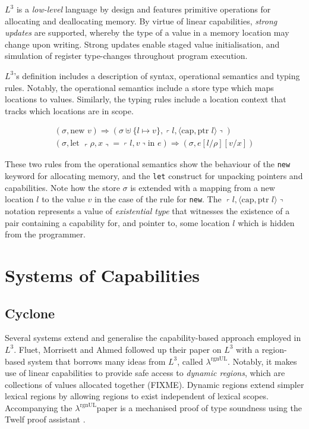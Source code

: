 \documentclass[]{unswthesis}
\newcommand{\lquine}{\left\ulcorner}
\newcommand{\rquine}{\right\urcorner}
\newcommand{\capa}{\text{cap}}
\newcommand{\ptr}{\text{ptr }}
\newcommand{\rgnUL}{$\lambda^\text{rgnUL}$\text{ }}
\begin{document}
$L^3$ is a \textit{low-level} language by design and features primitive operations for allocating and deallocating memory. By virtue of linear capabilities, \textit{strong updates} are supported, whereby the type of a value in a memory location may change upon writing. Strong updates enable staged value initialisation, and simulation of register type-changes throughout program execution.

$L^3$'s definition includes a description of syntax, operational semantics and typing rules. Notably, the operational semantics include a store type which maps locations to values. Similarly, the typing rules include a location context that tracks which locations are in scope.

\begin{eqnarray*}
(\sigma, \text{new } v) \Rightarrow (\sigma \uplus \{l \mapsto v\},
	\lquine l, \langle \capa, \ptr l \rangle \rquine)
\\
(\sigma, \text{let } \lquine \rho, x \rquine = \lquine l, v \rquine \text{in } e)
	\Rightarrow
	(\sigma, e[l/\rho][v/x])
\end{eqnarray*}

These two rules from the operational semantics show the behaviour of the \texttt{new} keyword for allocating memory, and the \texttt{let} construct for unpacking pointers and capabilities. Note how the store $\sigma$ is extended with a mapping from a new location $l$ to the value $v$ in the case of the rule for \texttt{new}. The $\lquine l, \langle \capa, \ptr l \rangle \rquine$ notation represents a value of \textit{existential type} that witnesses the existence of a pair containing a capability for, and pointer to, some location $l$ which is hidden from the programmer.

\section{Systems of Capabilities}

\subsection{Cyclone}

Several systems extend and generalise the capability-based approach employed in $L^3$. Fluet, Morrisett and Ahmed followed up their paper on $L^3$ with a region-based system that borrows many ideas from $L^3$, called \rgnUL \cite{fluet06}. Notably, it makes use of linear capabilities to provide safe access to \textit{dynamic regions}, which are collections of values allocated together (FIXME). Dynamic regions extend simpler lexical regions by allowing regions to exist independent of lexical scopes. Accompanying the \rgnUL paper is a mechanised proof of type soundness using the Twelf proof assistant \cite{pfenning99}.
\end{document}
